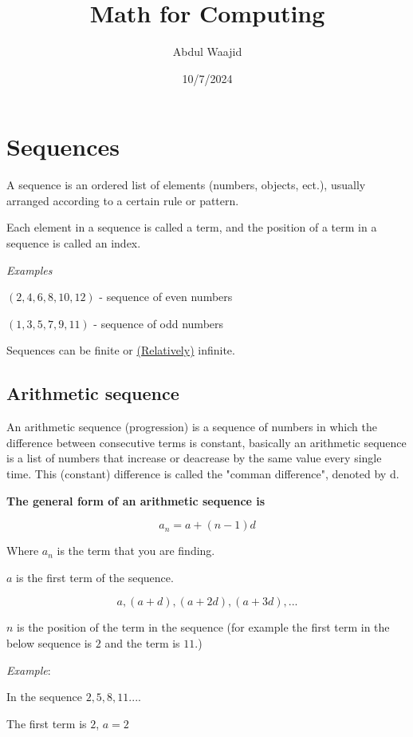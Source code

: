 \documentclass[]{book}
\title{Math for Computing}
\author{Abdul Waajid}
\date{10/7/2024}
\begin{document}
\maketitle


\section{Sequences }


A sequence is an ordered list of elements (numbers, objects, ect.), usually arranged according to a certain rule or pattern.

Each element in a sequence is called a term, and the position of a term in a sequence is called an index.

\vspace{0.5 cm}
\textit{Examples}

$(2, 4, 6, 8, 10, 12)$ - sequence of even numbers

$(1, 3, 5, 7, 9, 11)$ - sequence of odd numbers

Sequences can be finite or \href{https://chatgpt.com/share/67036ea9-4ee4-8013-807b-503ab41d091b}{(Relatively)} infinite.

\subsection{Arithmetic sequence}

An arithmetic sequence (progression) is a sequence of numbers in which the difference between consecutive terms is constant,
basically an arithmetic sequence is a list of numbers that increase or deacrease by the same value every single time. 
This (constant) difference is called the "comman 
difference", denoted by d. 

\textbf{The general form of an arithmetic sequence is}

$$ a_{n} = a + (n-1)d$$

Where $ a_{n}$ is the term that you are finding.

$a$ is the first term of the sequence.

$$ a, (a+d), (a+2d), (a+3d), ...  $$  

$n$ is the position of the term in the sequence (for example the first term in the below sequence is $2$ and the term is $11$.)

\vspace{0.5 cm}
\textit{Example}: 

In the sequence $2, 5, 8, 11 ...$.  

The first term is $ 2  $, $ a = 2  $
\end{document}
